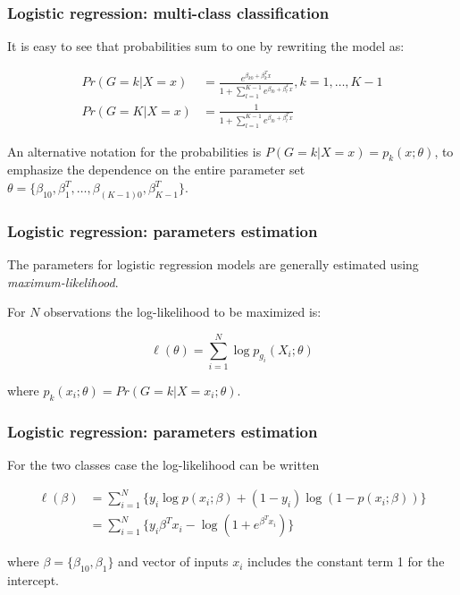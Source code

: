\documentclass[notes]{beamer}          %
\begin{document}
\begin{frame}
\frametitle{Logistic regression: multi-class classification}

It is easy to see that probabilities sum to one by rewriting the model as:

\begin{align*}
Pr(G=k | X=x) &= \frac{e^{\beta_{k0} + \beta_k^T x}}{1+\sum_{l=1}^{K-1} e^{\beta_{l0} + \beta_l^T x}}, k=1, \dots, K-1 \\
Pr(G=K | X=x) &= \frac{1}{1+\sum_{l=1}^{K-1} e^{\beta_{l0} + \beta_l^T x}}
\end{align*}

An alternative notation for the probabilities is $P(G=k|X=x) = p_k(x;\theta)$, to emphasize the dependence on the entire parameter set $\theta=  \{ \beta_{10}, \beta_1^T, \dots, \beta_{(K-1)0}, \beta_{K-1}^T \}$.

\end{frame}

\begin{frame}
\frametitle{Logistic regression: parameters estimation}

The parameters for logistic regression models are generally estimated using \textit{maximum-likelihood}.

\vspace{5mm} 

For $N$ observations the log-likelihood to be maximized is:

\begin{equation*}
    \ell(\theta) = \sum_{i=1}^N \log p_{g_i}(X_i; \theta)
\end{equation*}

where $p_k(x_i; \theta) = Pr(G=k|X=x_i; \theta)$.


\end{frame}

\begin{frame}
\frametitle{Logistic regression: parameters estimation}

For the two classes case the log-likelihood can be written

\begin{align*}
    \ell(\beta) &= \sum_{i=1}^N \{ y_i \log p(x_i;\beta) + (1-y_i) \log (1-p(x_i;\beta)) \} \\
    &= \sum_{i=1}^N \{ y_i \beta^T x_i - \log (1+e^{\beta^T x_i}) \}
\end{align*}

where $\beta=\{ \beta_{10}, \beta_1\}$ and vector of inputs $x_i$ includes the constant term 1 for the intercept.


\end{frame}
\end{document}
